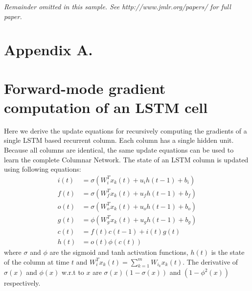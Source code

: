 \documentclass[twoside,11pt]{article}
\begin{document}
{\noindent \em Remainder omitted in this sample. See http://www.jmlr.org/papers/ for full paper.}




\newpage

\appendix
\section*{Appendix A.}

\section{Forward-mode gradient computation of an LSTM cell }

Here we derive the update equations for recursively computing the gradients of a single LSTM based recurrent column. Each column has a single hidden unit. Because all columns are identical, the same update equations can be used to learn the complete Columnar Network.  The state of an LSTM column is updated using following equations: 
\begin{align}
i(t) &= \sigma( W_{i}^T x_k(t) + u_{i} h(t-1) + b_i) \label{i} \\
f(t) &= \sigma( W_{f}^T x_k(t) + u_{f} h(t-1) + b_f) \label{f} \\
o(t) &= \sigma( W_{o}^T x_k(t) + u_{o} h(t-1) + b_o) \label{o} \\
g(t) &= \phi( W_{g}^T x_k(t) + u_{g} h(t-1) + b_g) \label{g} \\
c(t) &= f(t)  c(t-1) + i(t) g(t) \label{c} \\
h(t) &= o(t)  \phi(c(t)) \label{state_update}
\end{align}
where $\sigma$ and $\phi$ are the sigmoid and tanh activation functions, $h(t)$ is the state of the column at time $t$ and $ W_{i}^T x_k(t) = \sum_{k=1}^m W_{i_k} x_k(t)$. The derivative of $\sigma(x)$ and $\phi(x)$ w.r.t to $x$ are $\sigma(x)(1-\sigma(x))$ and $(1-\phi^2(x))$ respectively.
\end{document}
